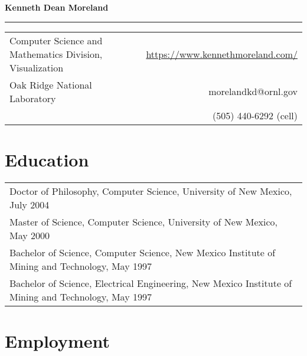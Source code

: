 \documentclass{article}
\date{\today}
\begin{document}
\begin{center}
  \textbf{\LARGE Kenneth Dean Moreland}
\end{center}

\rule{\textwidth}{1mm}

\begin{center}
  \begin{tabular*}{\textwidth}{@{\extracolsep{\fill}}lr}
    Computer Science and Mathematics Division, Visualization  & \url{https://www.kennethmoreland.com/} \\
    Oak Ridge National Laboratory                 & morelandkd@ornl.gov \\
                                                  & (505) 440-6292 (cell) \\
  \end{tabular*}
\end{center}

\begin{center}
  {\large
    \makeatletter
    \@date
    \makeatother
  }
\end{center}


\section*{Education}

\begin{tabular}{l}
  Doctor of Philosophy, Computer Science, University of New Mexico, July 2004 \\
  Master of Science, Computer Science, University of New Mexico, May 2000 \\
  Bachelor of Science, Computer Science, New Mexico Institute of Mining and Technology, May 1997 \\
  Bachelor of Science, Electrical Engineering, New Mexico Institute of Mining and Technology, May 1997 \\
\end{tabular}


\section*{Employment}
\end{document}
